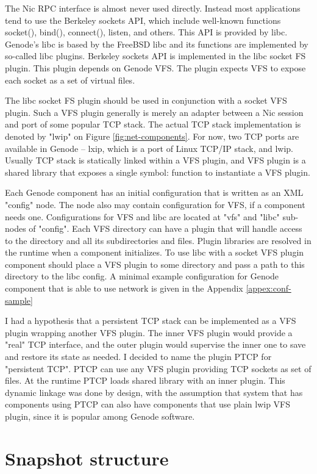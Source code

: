 The Nic RPC interface is almost never used directly. Instead most applications
tend to use the Berkeley sockets API, which include well-known functions
socket(), bind(), connect(), listen, and others. This API is provided by libc.
Genode's libc is based by the FreeBSD libc and its functions are implemented by
so-called libc plugins. Berkeley sockets API is implemented in the libc socket
FS plugin. This plugin depends on Genode VFS. The plugin expects VFS to expose
each socket as a set of virtual files.

The libc socket FS plugin should be used in conjunction with a socket VFS
plugin. Such a VFS plugin generally is merely an adapter between a Nic session
and port of some popular TCP stack. The actual TCP stack implementation is
denoted by "lwip" on Figure \ref{fig:net-components}. For now, two TCP ports
are available in Genode -- lxip, which is a port of Linux TCP/IP stack, and
lwip. Usually TCP stack is statically linked within a VFS plugin, and VFS
plugin is a shared library that exposes a single symbol: function to
instantiate a VFS plugin.

Each Genode component has an initial configuration that is written as an XML
"config" node. The node also may contain configuration for VFS, if a component
needs one. Configurations for VFS and libc are located at "vfs" and "libc"
sub-nodes of "config". Each VFS directory can have a plugin that will handle
access to the directory and all its subdirectories and files. Plugin libraries
are resolved in the runtime when a component initializes. To use libc with a
socket VFS plugin component should place a VFS plugin to some directory and
pass a path to this directory to the libc config. A minimal example
configuration for Genode component that is able to use network is given in the
Appendix \ref{appex:conf-sample}

I had a hypothesis that a persistent TCP stack can be implemented as a VFS
plugin wrapping another VFS plugin. The inner VFS plugin would provide a "real" 
TCP interface, and the outer plugin would supervise the inner one to save and
restore its state as needed. I decided to name the plugin PTCP for "persistent
TCP". PTCP can use any VFS plugin providing TCP sockets as set of files. At the
runtime PTCP loads shared library with an inner plugin. This dynamic linkage
was done by design, with the assumption that system that has components using
PTCP can also have components that use plain lwip VFS plugin, since it is
popular among Genode software.

\section{Snapshot structure}

